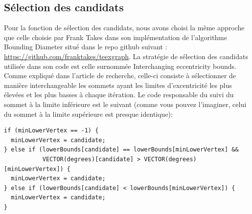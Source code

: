\documentclass[11pt]{article}
\begin{document}
\subsection{Sélection des candidats}
Pour la fonction de sélection des candidats, nous avons choisi la même approche
que celle choisie par Frank Takes dans son implémentation de l'algorithme
Bounding Diameter situé dans le repo github suivant :
\url{https://github.com/franktakes/teexgraph}. La stratégie de sélection des
candidats utilisée dans son code est celle surnommée Interchanging eccentricity
bounds. Comme expliqué dans l'article de recherche, celle-ci consiste à
sélectionner de manière interchangeable les sommets ayant les limites
d'excentricité les plus élevées et les plus basses à chaque itération. Le code
responsable du suivi du sommet à la limite inférieure est le suivant (comme vous
pouvez l'imaginer, celui du sommet à la limite supérieure est presque
identique):\newpage
\begin{verbatim}
if (minLowerVertex == -1) {
  minLowerVertex = candidate;
} else if (lowerBounds[candidate] == lowerBounds[minLowerVertex] &&
           VECTOR(degrees)[candidate] > VECTOR(degrees)[minLowerVertex]) {
  minLowerVertex = candidate;
} else if (lowerBounds[candidate] < lowerBounds[minLowerVertex]) {
  minLowerVertex = candidate;
}
\end{verbatim}
\end{document}
